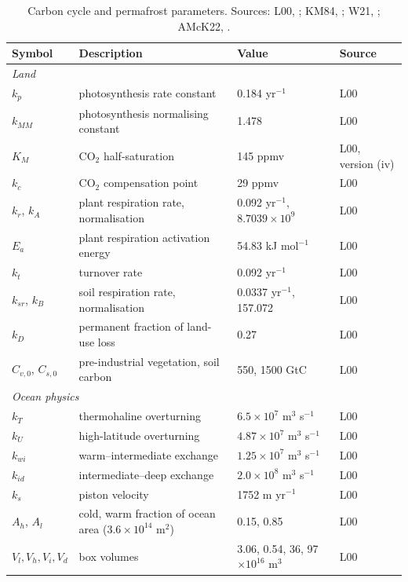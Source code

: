 \begin{table}[htbp]
\centering
\caption{Carbon cycle and permafrost parameters. Sources: L00, \citet{lentonLandOceanCarbon2000}; KM84, \citet{knoxChangesAtmosphericCO21984}; W21, \citet{woodardPermafrostImplementationSimple2021}; AMcK22, \citet{armstrongmckayExceeding15degCGlobal2022}.}
\label{tab:lenton_params}
\small
\begin{tabular}{llll}
\hline
Symbol & Description & Value & Source \\
\hline
\multicolumn{4}{l}{\textit{Land}} \\
$k_p$ & photosynthesis rate constant & 0.184 yr$^{-1}$ & L00 \\
$k_{MM}$ & photosynthesis normalising constant & 1.478 & L00 \\
$K_M$ & CO$_2$ half-saturation & 145 ppmv & L00, version (iv) \\
$k_c$ & CO$_2$ compensation point & 29 ppmv & L00 \\
$k_r$, $k_A$ & plant respiration rate, normalisation & 0.092 yr$^{-1}$, $8.7039\times10^{9}$ & L00 \\
$E_a$ & plant respiration activation energy & 54.83 kJ mol$^{-1}$ & L00 \\
$k_t$ & turnover rate & 0.092 yr$^{-1}$ & L00 \\
$k_{sr}$, $k_B$ & soil respiration rate, normalisation & 0.0337 yr$^{-1}$, 157.072 & L00 \\
$k_D$ & permanent fraction of land-use loss & 0.27 & L00 \\
$C_{v,0}$, $C_{s,0}$ & pre-industrial vegetation, soil carbon & 550, 1500 GtC & L00 \\
\multicolumn{4}{l}{\textit{Ocean physics}} \\
$k_T$ & thermohaline overturning & $6.5\times10^{7}$ m$^3$ s$^{-1}$ & L00 \\
$k_U$ & high-latitude overturning & $4.87\times10^{7}$ m$^3$ s$^{-1}$ & L00 \\
$k_{wi}$ & warm--intermediate exchange & $1.25\times10^{7}$ m$^3$ s$^{-1}$ & L00 \\
$k_{id}$ & intermediate--deep exchange & $2.0\times10^{8}$ m$^3$ s$^{-1}$ & L00 \\
$k_s$ & piston velocity & 1752 m yr$^{-1}$ & L00 \\
$A_h$, $A_l$ & cold, warm fraction of ocean area ($3.6\times10^{14}$ m$^2$) & 0.15, 0.85 & L00 \\
$V_l, V_h, V_i, V_d$ & box volumes & 3.06, 0.54, 36, 97 $\times10^{16}$ m$^3$ & L00 \\

\end{tabular}
\end{table}
